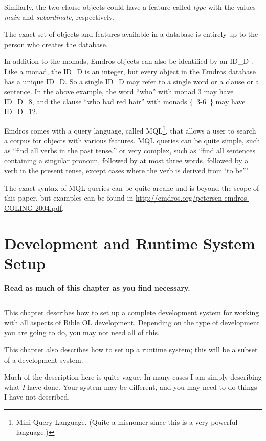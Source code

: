 \documentclass[11pt,oneside,a4paper]{memoir}
\newcommand*{\indexw}[1]{%
  #1%
  \index{#1}%
}
\begin{document}
Similarly, the two clause objects could have a feature called \emph{type} with the values
\emph{main} and \emph{subordinate,} respectively.

The exact set of objects and features available in a database is entirely up to the person who
creates the database.

In addition to the monads, Emdros objects can also be identified by an \indexw{ID\_D}. Like a monad, the ID\_D
is an integer, but every object in the Emdros database has a unique ID\_D. So a single ID\_D may refer to
a single word or a clause or a sentence. In the above example, the word ``who'' with monad 3 may
have ID\_D=8, and the clause ``who had red hair'' with monads \{~3-6~\} may have ID\_D=12.

Emdros comes with a query language, called MQL\footnote{Mini Query Language. (Quite a misnomer since
  this is a very powerful language.)}, that allows a user to search a corpus for objects with
various features. MQL queries can be quite simple, such as ``find all verbs in the past tense,'' or
very complex, such as ``find all sentences containing a singular pronoun, followed by at most three
words, followed by a verb in the present tense, except cases where the verb is derived from `to
be'.''

The exact syntax of MQL queries can be quite arcane and is beyond the scope of this paper, but
examples can be found in \url{http://emdros.org/petersen-emdros-COLING-2004.pdf}.

\chapter{Development and Runtime System Setup}

\textbf{Read as much of this chapter as you find necessary.}
\plainbreak{3}


This chapter describes how to set up a complete development system for working with all aspects of
Bible OL development. Depending on the type of development you are going to do, you may not need all
of this.

This chapter also describes how to set up a runtime system; this will be a subset of a development
system.

Much of the description here is quite vague. In many cases I am simply describing what \emph{I} have
done. Your system may be different, and you may need to do things I have not described.
\end{document}

